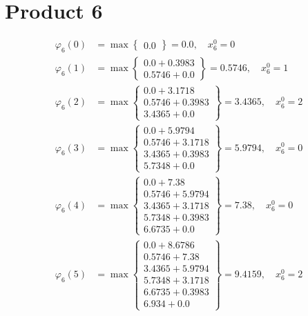 \documentclass{article}
\begin{document}
\section{Product 6}
\begin{align*}
\varphi_{6}(0) &= \max \left\{ \begin{array}{c}
0.0
\end{array} \right\}=0.0, \quad x_{6}^0=0\\
  
\varphi_{6}(1) &= \max \left\{ \begin{array}{c}
0.0 + 0.3983 \\
 0.5746 + 0.0
\end{array} \right\}=0.5746, \quad x_{6}^0=1\\
  
\varphi_{6}(2) &= \max \left\{ \begin{array}{c}
0.0 + 3.1718 \\
 0.5746 + 0.3983 \\
 3.4365 + 0.0
\end{array} \right\}=3.4365, \quad x_{6}^0=2\\
  
\varphi_{6}(3) &= \max \left\{ \begin{array}{c}
0.0 + 5.9794 \\
 0.5746 + 3.1718 \\
 3.4365 + 0.3983 \\
 5.7348 + 0.0
\end{array} \right\}=5.9794, \quad x_{6}^0=0\\
  
\varphi_{6}(4) &= \max \left\{ \begin{array}{c}
0.0 + 7.38 \\
 0.5746 + 5.9794 \\
 3.4365 + 3.1718 \\
 5.7348 + 0.3983 \\
 6.6735 + 0.0
\end{array} \right\}=7.38, \quad x_{6}^0=0\\
  
\varphi_{6}(5) &= \max \left\{ \begin{array}{c}
0.0 + 8.6786 \\
 0.5746 + 7.38 \\
 3.4365 + 5.9794 \\
 5.7348 + 3.1718 \\
 6.6735 + 0.3983 \\
 6.934 + 0.0
\end{array} \right\}=9.4159, \quad x_{6}^0=2\\
  

\end{align*}
\end{document}
